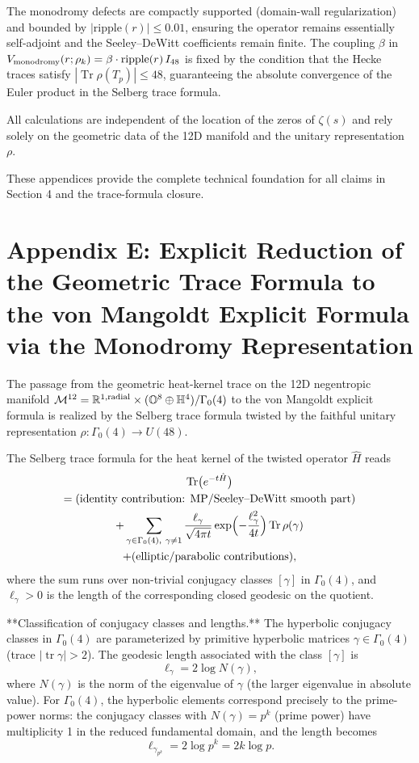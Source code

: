 \documentclass[11pt,a4paper]{article}
\begin{document}
The monodromy defects are compactly supported (domain-wall regularization) and bounded by \(|\mathrm{ripple}(r)| \le 0.01\), ensuring the operator remains essentially self-adjoint and the Seeley--DeWitt coefficients remain finite. The coupling \(\beta\) in \(V_{\rm monodromy}(r;\rho_k) = \beta \cdot \mathrm{ripple}(r) \, I_{48}\) is fixed by the condition that the Hecke traces satisfy \(|\operatorname{Tr}\rho(T_p)| \le 48\), guaranteeing the absolute convergence of the Euler product in the Selberg trace formula.

All calculations are independent of the location of the zeros of \(\zeta(s)\) and rely solely on the geometric data of the 12D manifold and the unitary representation \(\rho\).

These appendices provide the complete technical foundation for all claims in Section 4 and the trace-formula closure.

\section{Appendix E: Explicit Reduction of the Geometric Trace Formula to the von Mangoldt Explicit Formula via the Monodromy Representation}

The passage from the geometric heat-kernel trace on the 12D negentropic manifold \(\mathcal{M}^{12} = \mathbb{R}^{1,\rm radial} \times (\mathbb{O}^8 \oplus \mathbb{H}^4)/\Gamma_0(4)\) to the von Mangoldt explicit formula is realized by the Selberg trace formula twisted by the faithful unitary representation \(\rho : \Gamma_0(4) \to U(48)\).

The Selberg trace formula for the heat kernel of the twisted operator \(\hat{H}\) reads
\begin{multline}
\operatorname{Tr}\bigl(e^{-t\hat{H}}\bigr) \\
= \text{(identity contribution: MP/Seeley--DeWitt smooth part)} \\
+ \sum_{\gamma \in \Gamma_0(4),\ \gamma \neq 1} \frac{\ell_\gamma}{\sqrt{4\pi t}} \exp\Bigl(-\frac{\ell_\gamma^2}{4t}\Bigr) \operatorname{Tr}\rho(\gamma) \\
+ \text{(elliptic/parabolic contributions)},
\end{multline}
where the sum runs over non-trivial conjugacy classes \([\gamma]\) in \(\Gamma_0(4)\), and \(\ell_\gamma > 0\) is the length of the corresponding closed geodesic on the quotient.

**Classification of conjugacy classes and lengths.**  
The hyperbolic conjugacy classes in \(\Gamma_0(4)\) are parameterized by primitive hyperbolic matrices \(\gamma \in \Gamma_0(4)\) (trace \(|\operatorname{tr} \gamma| > 2\)). The geodesic length associated with the class \([\gamma]\) is
\[
\ell_\gamma = 2 \log N(\gamma),
\]
where \(N(\gamma)\) is the norm of the eigenvalue of \(\gamma\) (the larger eigenvalue in absolute value). For \(\Gamma_0(4)\), the hyperbolic elements correspond precisely to the prime-power norms: the conjugacy classes with \(N(\gamma) = p^k\) (prime power) have multiplicity 1 in the reduced fundamental domain, and the length becomes
\[
\ell_{\gamma_{p^k}} = 2 \log p^k = 2k \log p.
\]
\end{document}
